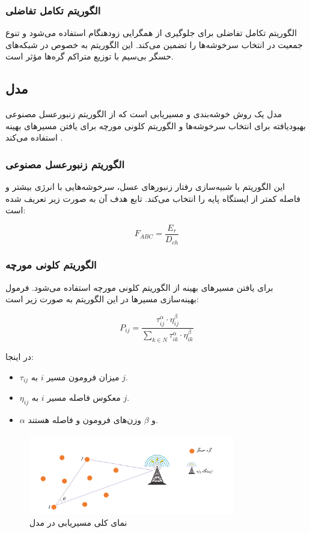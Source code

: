 \documentclass[12pt, onecolumn, a4paper]{article}
\begin{document}
\subsubsection{الگوریتم تکامل تفاضلی}
الگوریتم تکامل تفاضلی برای جلوگیری از همگرایی زودهنگام استفاده می‌شود و تنوع جمعیت در انتخاب سرخوشه‌ها را تضمین می‌کند. این الگوریتم به خصوص در شبکه‌های حسگر بی‌سیم با توزیع متراکم گره‌ها مؤثر است.

\subsection{مدل }
مدل  یک روش خوشه‌بندی و مسیریابی است که از الگوریتم زنبورعسل مصنوعی بهبودیافته برای انتخاب سرخوشه‌ها و الگوریتم کلونی مورچه برای یافتن مسیرهای بهینه استفاده می‌کند \cite{ref9, ref10}.

\subsubsection{الگوریتم زنبورعسل مصنوعی}
این الگوریتم با شبیه‌سازی رفتار زنبورهای عسل، سرخوشه‌هایی با انرژی بیشتر و فاصله کمتر از ایستگاه پایه را انتخاب می‌کند. تابع هدف آن به صورت زیر تعریف شده است:

\begin{equation}
	F_{ABC} = \frac{E_r}{D_{ch}}
\end{equation}

\subsubsection{الگوریتم کلونی مورچه}
برای یافتن مسیرهای بهینه از الگوریتم کلونی مورچه استفاده می‌شود. فرمول بهینه‌سازی مسیرها در این الگوریتم به صورت زیر است:

\begin{equation}
	P_{ij} = \frac{\tau_{ij}^\alpha \cdot \eta_{ij}^\beta}{\sum_{k \in N} \tau_{ik}^\alpha \cdot \eta_{ik}^\beta}
\end{equation}

در اینجا:
\begin{itemize}
	\item $\tau_{ij}$ میزان فرومون مسیر $i$ به $j$.
	\item $\eta_{ij}$ معکوس فاصله مسیر $i$ به $j$.
	\item $\alpha$ و $\beta$ وزن‌های فرومون و فاصله هستند.
\end{itemize}

\begin{figure}[h]
	\centering
	\includegraphics[width=0.8\textwidth]{routing-abc-aco.png}
	\caption{نمای کلی مسیریابی در مدل }
	\label{fig:routing_abc_aco}
\end{figure}
\end{document}
